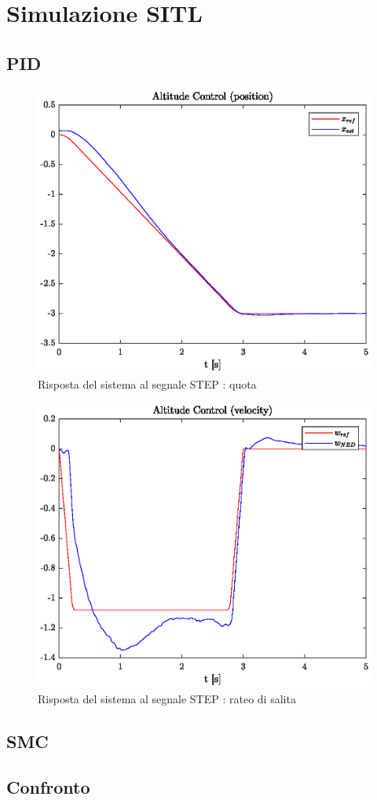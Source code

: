 \section{Simulazione SITL}
\subsection{PID}

\begin{figure}
	\centering
	\includegraphics[width=1\textwidth]{Simulazioni/Figure/STEPaltitudecontrolpos}
	\caption{Risposta del sistema al segnale STEP : quota}
\end{figure}

\begin{figure}
	\centering
	\includegraphics[width=1\textwidth]{Simulazioni/Figure/STEPaltitudecontrolvel}
	\caption{Risposta del sistema al segnale STEP : rateo di salita}
\end{figure}

\subsection{SMC}

\subsection{Confronto}